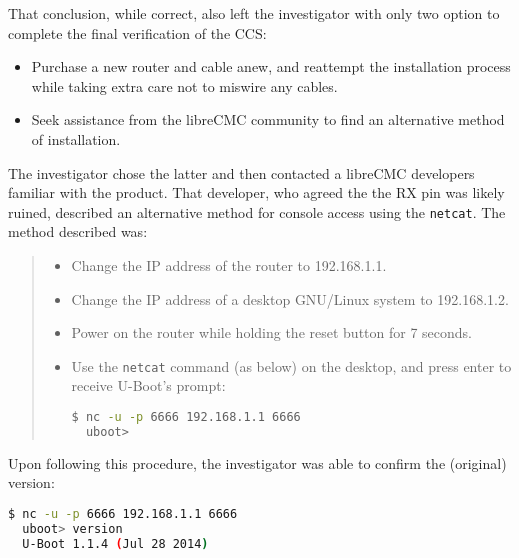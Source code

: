 That conclusion, while correct, also left the investigator with only two
option to complete the final verification of the CCS:

\begin{itemize}

   \item Purchase a new router and cable anew, and reattempt the installation
     process while taking extra care not to miswire any cables.

   \item Seek assistance from the libreCMC community to find an alternative
     method of installation.

\end{itemize}

The investigator chose the latter and then contacted a libreCMC developers
familiar with the product.  That developer, who  agreed the the RX pin was
likely ruined, described an alternative method for console access using the
{\tt netcat}.  The method described was:

\begin{quotation}

  \begin{itemize}

  \item Change the IP address of the router to 192.168.1.1.

  \item Change the IP address of a desktop GNU/Linux system to 192.168.1.2.

  \item Power on the router while holding the reset button for 7 seconds.

  \item Use the {\tt netcat} command (as below) on the desktop, and press
    enter to receive U-Boot's prompt:
    
\lstset{tabsize=2}
\begin{lstlisting}[language=bash]
  $ nc -u -p 6666 192.168.1.1 6666
  uboot>
\end{lstlisting}
  \end{itemize}
\end{quotation}

Upon following this procedure, the investigator was able to confirm the
(original)  version:
\begin{lstlisting}[language=bash]
  $ nc -u -p 6666 192.168.1.1 6666
  uboot> version
  U-Boot 1.1.4 (Jul 28 2014)
\end{lstlisting}

